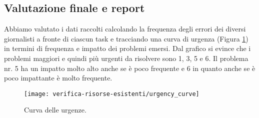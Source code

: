 \subsection{Valutazione finale e report}
Abbiamo valutato i dati raccolti calcolando la frequenza degli errori dei diversi giornalisti a fronte di ciascun task e tracciando una curva di urgenza (Figura \ref{fig:urgency-curves}) in termini di frequenza e impatto dei problemi emersi.
Dal grafico  si evince che i problemi maggiori e quindi più urgenti da risolvere sono 1, 3, 5 e 6. Il problema nr. 5 ha un impatto molto alto anche se è poco frequente e  6 in quanto anche se è poco impattante è molto frequente.

\begin{figure}[H]
    \centering
    \texttt{[image: verifica-risorse-esistenti/urgency\_curve]}
    \caption{Curva delle urgenze.}
    \label{fig:urgency-curves}
\end{figure}
